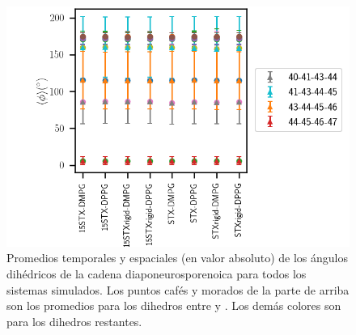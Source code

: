 \begin{figure}
\begin{center}
    \includegraphics[scale=0.4]{Plots/dihedrals.png}
  \caption{Promedios temporales y espaciales (en valor absoluto) de los \'{a}ngulos dih\'{e}dricos de la cadena diaponeurosporenoica para todos los sistemas simulados. Los puntos caf\'{e}s y morados de la parte de arriba son los promedios para los dihedros entre  y . Los dem\'{a}s colores son para los dihedros restantes.}
  \label{fig:dihavg}
\end{center}
\end{figure}

